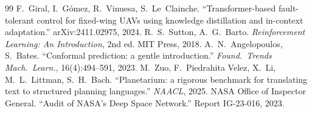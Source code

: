 \documentclass[11pt]{article}
\begin{document}
\begin{thebibliography}{99}
 F.~Giral, I.~G\'omez, R.~Vinuesa, S.~Le~Clainche. ``Transformer-based fault-tolerant control for fixed-wing UAVs using knowledge distillation and in-context adaptation.'' arXiv:2411.02975, 2024.
 R.~S.~Sutton, A.~G.~Barto. \emph{Reinforcement Learning: An Introduction}, 2nd ed. MIT Press, 2018.
 A.~N.~Angelopoulos, S.~Bates. ``Conformal prediction: a gentle introduction.'' \emph{Found.\ Trends Mach.\ Learn.}, 16(4):494--591, 2023.
 M.~Zuo, F.~Piedrahita Velez, X.~Li, M.~L.~Littman, S.~H.~Bach. ``Planetarium: a rigorous benchmark for translating text to structured planning languages.'' \emph{NAACL}, 2025.
 NASA Office of Inspector General. ``Audit of NASA's Deep Space Network.'' Report IG-23-016, 2023.
\end{thebibliography}
\end{document}
